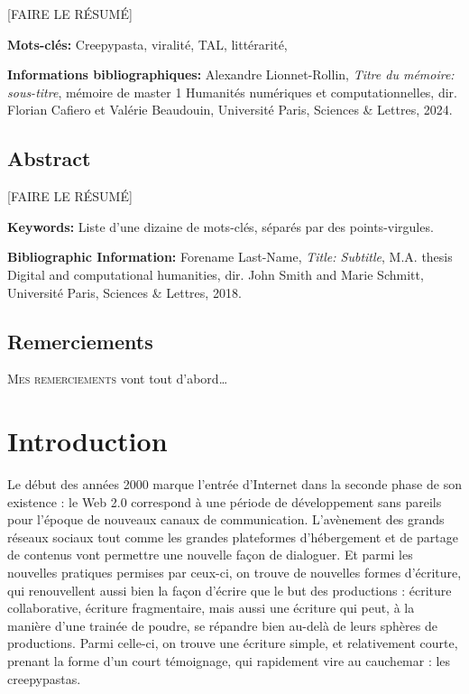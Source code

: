 \documentclass[12pt,a4paper,oneside,titlepage]{book} %
\begin{document}
[FAIRE LE RÉSUMÉ]

\medskip

\textbf{Mots-clés:} Creepypasta, viralité, TAL, littérarité, 

\textbf{Informations bibliographiques:} Alexandre Lionnet-Rollin, \textit{Titre du mémoire: sous-titre}, mémoire de master 1 \og Humanités numériques et computationnelles\fg{}, dir. Florian Cafiero et Valérie Beaudouin, Université Paris, Sciences \& Lettres, 2024.


\section*{Abstract}

[FAIRE LE RÉSUMÉ]

\medskip

\textbf{Keywords:} Liste d'une dizaine de mots-clés, séparés par des points-virgules.

\textbf{Bibliographic Information:} Forename Last-Name, \textit{Title: Subtitle}, M.A. thesis \og Digital and computational humanities\fg{}, dir. John Smith  and Marie Schmitt, Université Paris, Sciences \& Lettres, 2018.


\clearpage
\thispagestyle{empty}
\cleardoublepage


\section*{Remerciements}

\lettrine{M}{es remerciements} vont tout d'abord…


\clearpage
\thispagestyle{empty}
\cleardoublepage
\chapter*{Introduction}

Le début des années 2000 marque l’entrée d’Internet dans la seconde phase de son existence : le Web 2.0 correspond à une période de développement sans pareils pour l’époque de nouveaux canaux de communication. L’avènement des grands réseaux sociaux tout comme les grandes plateformes d’hébergement et de partage de contenus vont permettre une nouvelle façon de dialoguer. Et parmi les nouvelles pratiques permises par ceux-ci, on trouve de nouvelles formes d'écriture, qui renouvellent aussi bien la façon d’écrire que le but des productions : écriture collaborative, écriture fragmentaire, mais aussi une écriture qui peut, à la manière d'une trainée de poudre, se répandre bien au-delà de leurs sphères de productions. Parmi celle-ci, on trouve une écriture simple, et relativement courte, prenant la forme d'un court témoignage, qui rapidement vire au cauchemar : les creepypastas. 
	
\end{document}
